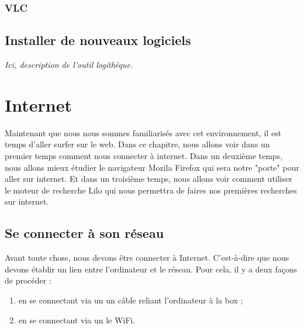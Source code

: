 \documentclass[12pt]{book}
\begin{document}
	\subsection{VLC}

\section{Installer de nouveaux logiciels}
	\textit{Ici, description de l'outil logithèque.}

\chapter{Internet}
Maintenant que nous nous sommes familiarisés avec cet environnement, il est temps d'aller surfer sur le web.\newline
Dans ce chapitre, nous allons voir dans un premier temps comment nous connecter à internet.
Dans un deuxième temps, nous allons mieux étudier le navigateur Mozila Firefox qui sera notre "porte" pour aller sur internet.
Et dans un troisième temps, nous allons voir comment utiliser le moteur de recherche Lilo qui nous permettra de faires nos premières recherches sur internet.
\section{Se connecter à son réseau}
	Avant toute chose, nous devons être connecter à Internet. C'est-à-dire que nous devons établir un lien entre l'ordinateur et le réseau.
	Pour cela, il y a deux façons de procéder :
	\begin{enumerate}
		\item en se connectant via un un câble reliant l'ordinateur à la box ;
		\item en se connectant via un le WiFi.
	\end{enumerate}
\end{document}
